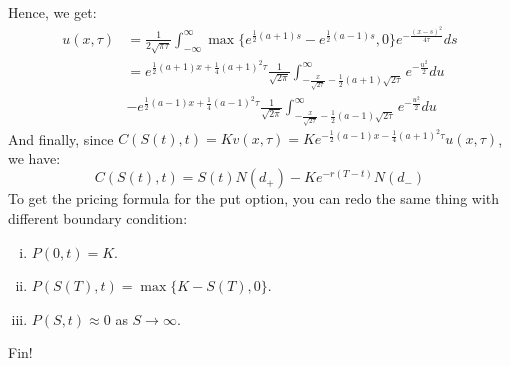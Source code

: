 Hence, we get:
\begin{align*}
    u(x,\tau) &= \frac{1}{2\sqrt{\pi \tau}}\int_{-\infty}^{\infty} \max\{e^{\frac{1}{2}(a+1)s}-e^{\frac{1}{2}(a-1)s}, 0\}e^{-\frac{(x-s)^2}{4\tau}}ds \\
    &= e^{\frac{1}{2}(a+1)x+\frac{1}{4}(a+1)^2\tau}\frac{1}{\sqrt{2\pi}}\int_{-\frac{x}{\sqrt{2\tau}}-\frac{1}{2}(a+1)\sqrt{2\tau}}^{\infty} e^{-\frac{u^2}{2}}du \\
    &- e^{\frac{1}{2}(a-1)x+\frac{1}{4}(a-1)^2\tau}\frac{1}{\sqrt{2\pi}}\int_{-\frac{x}{\sqrt{2\tau}}-\frac{1}{2}(a-1)\sqrt{2\tau}}^{\infty} e^{-\frac{u^2}{2}}du
\end{align*}
And finally, since \(C(S(t),t) = Kv(x,\tau) = Ke^{-\frac{1}{2}(a-1)x-\frac{1}{4}(a+1)^2\tau}u(x,\tau)\), we have:
\begin{equation*}
    C(S(t),t) = S(t)N(d_+) - Ke^{-r(T-t)}N(d_{-})
\end{equation*}
To get the pricing formula for the put option, you can redo the same thing with different boundary condition:
\begin{enumerate}[i.]
    \item \(P(0,t) = K\).
    \item \(P(S(T),t) = \max\{K - S(T), 0\}\).
    \item \(P(S,t) \approx 0\) as \(S \to \infty\).
\end{enumerate}

Fin!

